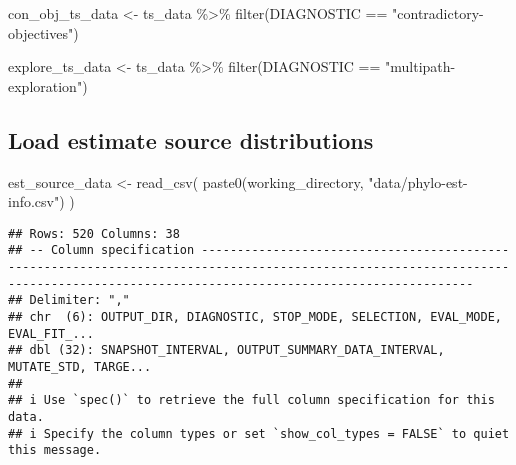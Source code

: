 \documentclass[
]{book}
\newenvironment{Shaded}{\begin{snugshade}}{\end{snugshade}}
\newcommand{\FunctionTok}[1]{\textcolor[rgb]{0.00,0.00,0.00}{#1}}
\newcommand{\NormalTok}[1]{#1}
\newcommand{\OtherTok}[1]{\textcolor[rgb]{0.56,0.35,0.01}{#1}}
\newcommand{\SpecialCharTok}[1]{\textcolor[rgb]{0.00,0.00,0.00}{#1}}
\newcommand{\StringTok}[1]{\textcolor[rgb]{0.31,0.60,0.02}{#1}}
\begin{document}
\begin{Shaded}
\begin{Highlighting}[]
\NormalTok{con\_obj\_ts\_data }\OtherTok{\textless{}{-}}\NormalTok{ ts\_data }\SpecialCharTok{\%\textgreater{}\%}
  \FunctionTok{filter}\NormalTok{(DIAGNOSTIC }\SpecialCharTok{==} \StringTok{"contradictory{-}objectives"}\NormalTok{)}

\NormalTok{explore\_ts\_data }\OtherTok{\textless{}{-}}\NormalTok{ ts\_data }\SpecialCharTok{\%\textgreater{}\%}
  \FunctionTok{filter}\NormalTok{(DIAGNOSTIC }\SpecialCharTok{==} \StringTok{"multipath{-}exploration"}\NormalTok{)}
\end{Highlighting}
\end{Shaded}

\hypertarget{load-estimate-source-distributions}{%
\subsection{Load estimate source distributions}\label{load-estimate-source-distributions}}

\begin{Shaded}
\begin{Highlighting}[]
\NormalTok{est\_source\_data }\OtherTok{\textless{}{-}} \FunctionTok{read\_csv}\NormalTok{(}
  \FunctionTok{paste0}\NormalTok{(working\_directory, }\StringTok{"data/phylo{-}est{-}info.csv"}\NormalTok{)}
\NormalTok{)}
\end{Highlighting}
\end{Shaded}

\begin{verbatim}
## Rows: 520 Columns: 38
## -- Column specification ----------------------------------------------------------------------------------------------------------------------------------------------------------------------------------
## Delimiter: ","
## chr  (6): OUTPUT_DIR, DIAGNOSTIC, STOP_MODE, SELECTION, EVAL_MODE, EVAL_FIT_...
## dbl (32): SNAPSHOT_INTERVAL, OUTPUT_SUMMARY_DATA_INTERVAL, MUTATE_STD, TARGE...
## 
## i Use `spec()` to retrieve the full column specification for this data.
## i Specify the column types or set `show_col_types = FALSE` to quiet this message.
\end{verbatim}
\end{document}
